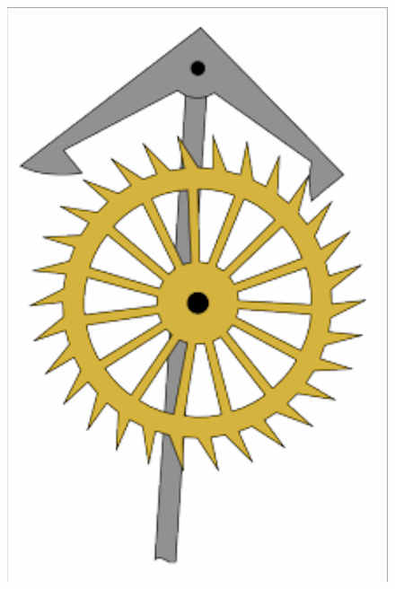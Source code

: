 \begin{figure}[htb]
\includegraphics[trim=2 2 2 2,clip,scale=0.3]{./Bilder/Anker_10.png}

\end{figure}
